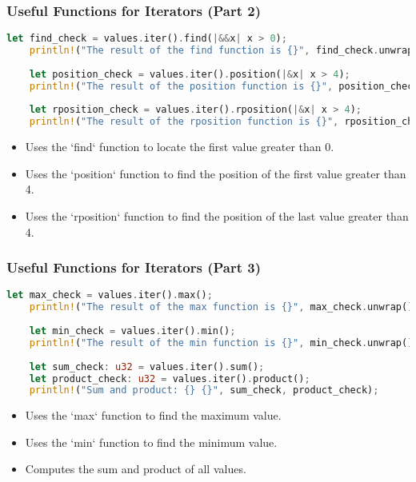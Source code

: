 \documentclass[aspectratio=169, table]{beamer}
\begin{document}
\begin{frame}[fragile]
\frametitle{Useful Functions for Iterators (Part 2)}
\vspace{15pt}
\begin{lstlisting}[language=Rust]
	let find_check = values.iter().find(|&&x| x > 0);
	println!("The result of the find function is {}", find_check.unwrap());
	
	let position_check = values.iter().position(|&x| x > 4);
	println!("The result of the position function is {}", position_check.unwrap());
	
	let rposition_check = values.iter().rposition(|&x| x > 4);
	println!("The result of the rposition function is {}", rposition_check.unwrap());
\end{lstlisting}
\begin{itemize}
	\item Uses the `find` function to locate the first value greater than 0.
	\item Uses the `position` function to find the position of the first value greater than 4.
	\item Uses the `rposition` function to find the position of the last value greater than 4.
\end{itemize}
\end{frame}

\begin{frame}[fragile]
\frametitle{Useful Functions for Iterators (Part 3)}
\vspace{15pt}
\begin{lstlisting}[language=Rust]
	let max_check = values.iter().max();
	println!("The result of the max function is {}", max_check.unwrap());
	
	let min_check = values.iter().min();
	println!("The result of the min function is {}", min_check.unwrap());
	
	let sum_check: u32 = values.iter().sum();
	let product_check: u32 = values.iter().product(); 
	println!("Sum and product: {} {}", sum_check, product_check);
\end{lstlisting}
\begin{itemize}
	\item Uses the `max` function to find the maximum value.
	\item Uses the `min` function to find the minimum value.
	\item Computes the sum and product of all values.
\end{itemize}
\end{frame}
\end{document}
